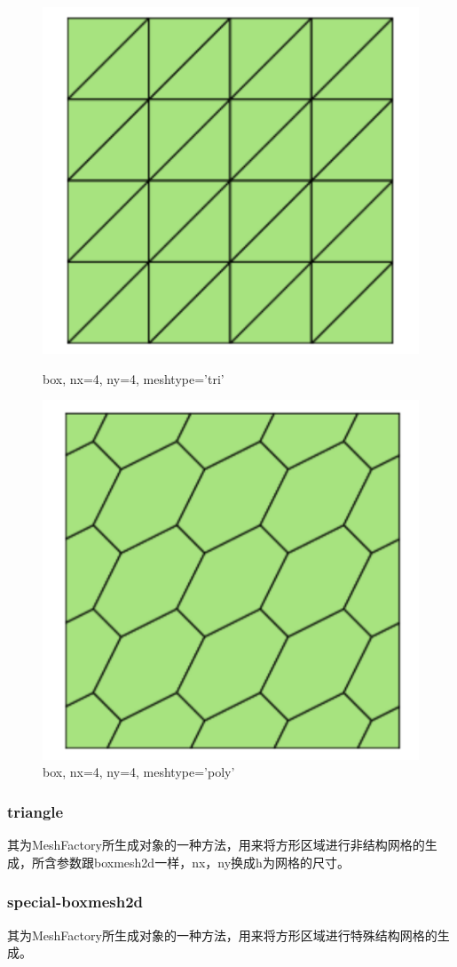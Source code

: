 \begin{figure}[htbp]
	\begin{minipage}[t]{0.35\linewidth}
		\centering
		\includegraphics[scale=0.5]{figures/fealpy/boxmesh2d-tri}
		\caption*{box, nx=4, ny=4, meshtype='tri'}
	\end{minipage}%
	\hfill
	\begin{minipage}[t]{0.5\linewidth}
		\centering
		\includegraphics[scale=0.5]{figures/fealpy/boxmesh2d-poly}
		\caption*{box, nx=4, ny=4, meshtype='poly'}
	\end{minipage}
\end{figure}

\subsubsection{triangle}
其为MeshFactory所生成对象的一种方法，用来将方形区域进行非结构网格的生成，所含参数跟boxmesh2d一样，nx，ny换成h为网格的尺寸。

\subsubsection{special-boxmesh2d}
其为MeshFactory所生成对象的一种方法，用来将方形区域进行特殊结构网格的生成。